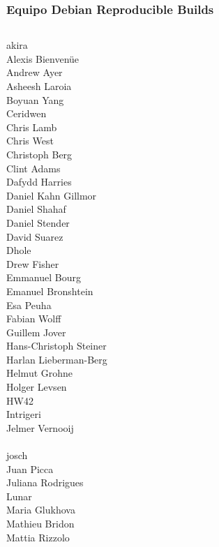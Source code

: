 \documentclass[14pt,aspectratio=169]{beamer}
\begin{document}
\begin{frame}
 \frametitle{Equipo Debian Reproducible Builds}
 \begin{center}
  \begin{columns}
   \scriptsize
    {akira} \\
    {Alexis Bienvenüe} \\
    {Andrew Ayer} \\
    {Asheesh Laroia} \\
    Boyuan Yang \\
    {Ceridwen} \\
    {Chris Lamb} \\
    {Chris West} \\
    {Christoph Berg} \\
    Clint Adams \\
    Dafydd Harries \\
    {Daniel Kahn Gillmor} \\
    {Daniel Shahaf} \\
    Daniel Stender \\
    David Suarez \\
    {Dhole} \\
    Drew Fisher \\
    Emmanuel Bourg \\
    Emanuel Bronshtein \\
    Esa Peuha \\
    {Fabian Wolff} \\
    {Guillem Jover} \\
    Hans-Christoph Steiner \\
    Harlan Lieberman-Berg \\
    {Helmut Grohne} \\
    {Holger Levsen} \\
    HW42 \\
    Intrigeri \\
    {Jelmer Vernooij} \\
     \\
    {josch} \\
    Juan Picca \\
    Juliana Rodrigues \\
    {Lunar} \\
    Maria Glukhova \\
    Mathieu Bridon \\
    {Mattia Rizzolo} \\

\end{columns}
\end{center}
\end{frame}
\end{document}
